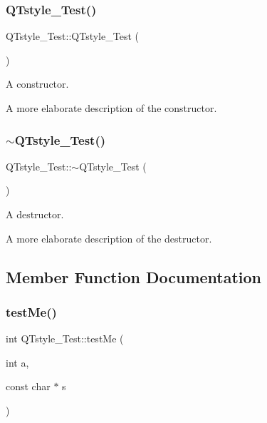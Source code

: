 \subsubsection{\texorpdfstring{Q\+Tstyle\+\_\+\+Test()}{QTstyle\_Test()}}
{\footnotesize\ttfamily Q\+Tstyle\+\_\+\+Test\+::\+Q\+Tstyle\+\_\+\+Test (\begin{DoxyParamCaption}{ }\end{DoxyParamCaption})}



A constructor. 

A more elaborate description of the constructor. \mbox{\label{class_q_tstyle___test_a7e82397d534d9a867f0857da01a46e9e}} 
\subsubsection{\texorpdfstring{$\sim$\+Q\+Tstyle\+\_\+\+Test()}{~QTstyle\_Test()}}
{\footnotesize\ttfamily Q\+Tstyle\+\_\+\+Test\+::$\sim$\+Q\+Tstyle\+\_\+\+Test (\begin{DoxyParamCaption}{ }\end{DoxyParamCaption})}



A destructor. 

A more elaborate description of the destructor. 

\subsection{Member Function Documentation}
\mbox{\label{class_q_tstyle___test_a8840748753118dd468e8368a28e49c62}} 
\subsubsection{\texorpdfstring{test\+Me()}{testMe()}}
{\footnotesize\ttfamily int Q\+Tstyle\+\_\+\+Test\+::test\+Me (\begin{DoxyParamCaption}\item[{int}]{a,  }\item[{const char $\ast$}]{s }\end{DoxyParamCaption})}



